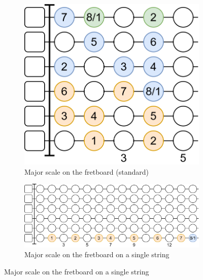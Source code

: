 \begin{figure}[h]
	\begin{subfigure}[b]{0.45\textwidth}
		\centering
		\includegraphics[height=0.18\textheight]{../../Images/guitar_major_scale_standard.png}
		\caption{Major scale on the fretboard (standard)}
		\label{fig:guitar_major_scale_fretboard_standard}
	\end{subfigure}
	\hfill
		
	\vspace{0.5cm}
	\begin{subfigure}[b]{\textwidth}
		\centering
		\includegraphics[height=0.18\textheight]{../../Images/guitar_major_scale_single_string.png}
		\caption{Major scale on the fretboard on a single string}
		\label{fig:guitar_major_scale_fretboard_single_string}
	\end{subfigure}
	

\end{figure}
